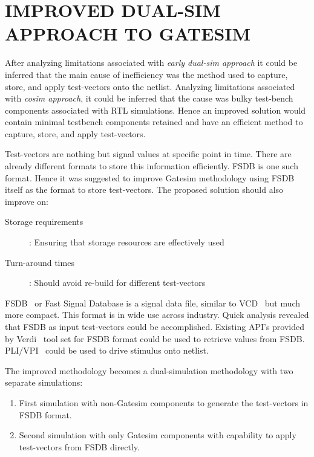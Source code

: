 \chapter{IMPROVED DUAL-SIM APPROACH TO GATESIM}
\label{chap:dualsim.tex}
After analyzing limitations associated with \emph{early dual-sim approach} it could be inferred that the main cause of inefficiency was the method used to capture, store, and apply test-vectors onto the netlist. Analyzing limitations associated with \emph{cosim approach}, it could be inferred that the cause was bulky test-bench components associated with RTL simulations. Hence an improved solution would contain minimal testbench components retained and have an efficient method to capture, store, and apply test-vectors. 

Test-vectors are nothing but signal values at specific point in time. There are already different formats to store this information efficiently. FSDB  is one such format. Hence it was suggested to improve Gatesim methodology using FSDB itself as the format to store test-vectors. The proposed solution should also improve on:

\begin{description}
	\item[Storage requirements]: Ensuring that storage resources are effectively used
	\item[Turn-around times]: Should avoid re-build for different test-vectors
\end{description}

FSDB~\citep{SS:Verdi} or Fast Signal Database is a signal data file, similar to VCD~\citep{ieee:v:2005}  but much more compact. This format is in wide use across industry. Quick analysis revealed that FSDB as input test-vectors could be accomplished. Existing API's  provided by Verdi~\citep{SS:Verdi} tool set for FSDB format could be used to retrieve values from FSDB. PLI$/$VPI~\citep{ieee:v:2005} could be used to drive stimulus onto netlist.


The improved methodology becomes a dual-simulation methodology with two separate simulations:
\begin{enumerate}
	\item First simulation with non-Gatesim components to generate the test-vectors in FSDB format.
	\item Second simulation with only Gatesim components with capability to apply test-vectors from FSDB directly.
\end{enumerate}



